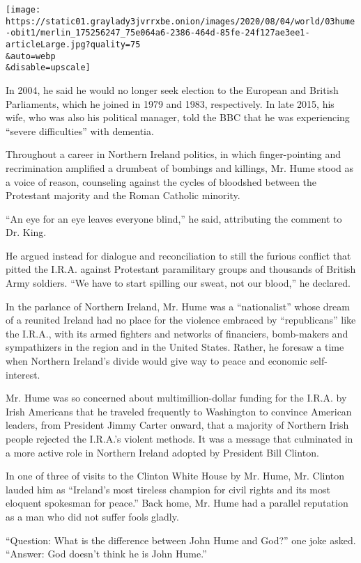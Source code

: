 \texttt{[image: https://static01.graylady3jvrrxbe.onion/images/2020/08/04/world/03hume-obit1/merlin\_175256247\_75e064a6-2386-464d-85fe-24f127ae3ee1-articleLarge.jpg?quality=75\\\&auto=webp\\\&disable=upscale]}

In 2004, he said he would no longer seek election to the European and
British Parliaments, which he joined in 1979 and 1983, respectively. In
late 2015, his wife, who was also his political manager, told the BBC
that he was experiencing ``severe difficulties'' with dementia.

Throughout a career in Northern Ireland politics, in which
finger-pointing and recrimination amplified a drumbeat of bombings and
killings, Mr. Hume stood as a voice of reason, counseling against the
cycles of bloodshed between the Protestant majority and the Roman
Catholic minority.

``An eye for an eye leaves everyone blind,'' he said, attributing the
comment to Dr. King.

He argued instead for dialogue and reconciliation to still the furious
conflict that pitted the I.R.A. against Protestant paramilitary groups
and thousands of British Army soldiers. ``We have to start spilling our
sweat, not our blood,'' he declared.

In the parlance of Northern Ireland, Mr. Hume was a ``nationalist''
whose dream of a reunited Ireland had no place for the violence embraced
by ``republicans'' like the I.R.A., with its armed fighters and networks
of financiers, bomb-makers and sympathizers in the region and in the
United States. Rather, he foresaw a time when Northern Ireland's divide
would give way to peace and economic self-interest.

Mr. Hume was so concerned about multimillion-dollar funding for the
I.R.A. by Irish Americans that he traveled frequently to Washington to
convince American leaders, from President Jimmy Carter onward, that a
majority of Northern Irish people rejected the I.R.A.'s violent methods.
It was a message that culminated in a more active role in Northern
Ireland adopted by President Bill Clinton.

In one of three of visits to the Clinton White House by Mr. Hume, Mr.
Clinton lauded him as ``Ireland's most tireless champion for civil
rights and its most eloquent spokesman for peace.'' Back home, Mr. Hume
had a parallel reputation as a man who did not suffer fools gladly.

``Question: What is the difference between John Hume and God?'' one joke
asked. ``Answer: God doesn't think he is John Hume.''

